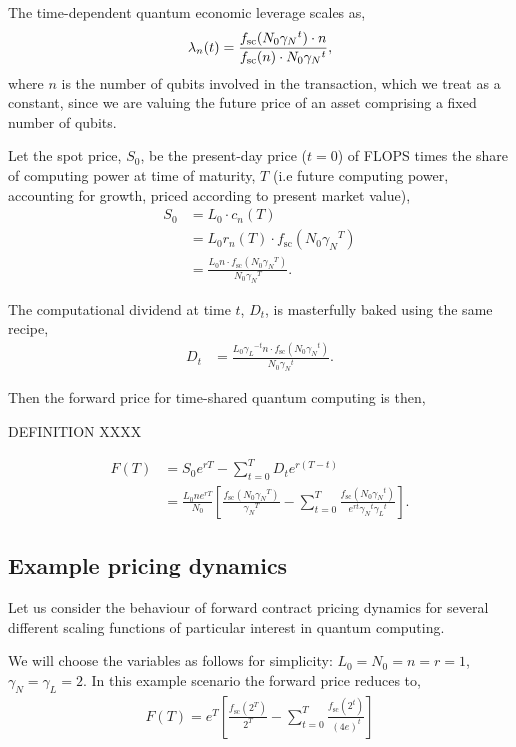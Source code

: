 \documentclass[aps,pra,twocolumn,amsmath,amssymb,nofootinbib,superscriptaddress]{revtex4}
\begin{document}
The time-dependent quantum economic leverage scales as,
\begin{align}\index{Quantum economic leverage}
\lambda_n(t) = \frac{f_\text{sc}(N_0 {\gamma_N}^{t})\cdot n}{f_\text{sc}(n) \cdot N_0 {\gamma_N}^{t}},
\end{align}
where $n$ is the number of qubits involved in the transaction, which we treat as a constant, since we are valuing the future price of an asset comprising a fixed number of qubits.

Let the spot price, $S_0$, be the present-day price ($t=0$) of FLOPS times the share of computing power at time of maturity, $T$ (i.e future computing power, accounting for growth, priced according to present market value),
\begin{align}
S_0 &= L_0 \cdot c_n(T) \nonumber \\
&= L_0 r_n(T) \cdot f_\text{sc}(N_0 {\gamma_N}^{T}) \nonumber \\
&= \frac{L_0 n\cdot f_\text{sc}(N_0 {\gamma_N}^{T})}{N_0 {\gamma_N}^{T}}.
\end{align}

The computational dividend at time $t$, $D_t$, is masterfully baked using the same recipe,
\begin{align}
D_t &= \frac{L_0 {\gamma_L}^{-t} n\cdot f_\text{sc}(N_0 {\gamma_N}^{t})}{N_0 {\gamma_N}^{t}}.
\end{align}

Then the forward price for time-shared quantum computing is then,

DEFINITION XXXX

\begin{align}
F(T) &= S_0 e^{rT} - \sum_{t=0}^T D_t e^{r(T-t)} \nonumber \\
&= \frac{L_0 n e^{rT}}{N_0}\left[ \frac{f_\text{sc}(N_0 {\gamma_N}^{T})}{{\gamma_N}^T} - \sum_{t=0}^T \frac{f_\text{sc}(N_0 {\gamma_N}^{t})}{e^{rt}{\gamma_N}^t{\gamma_L}^{t}}\right].
\end{align}

\subsection{Example pricing dynamics}

Let us consider the behaviour of forward contract pricing dynamics for several different scaling functions of particular interest in quantum computing.

We will choose the variables as follows for simplicity: \mbox{$L_0=N_0=n=r=1$}, \mbox{$\gamma_N=\gamma_L=2$}. In this example scenario the forward price reduces to,
\begin{align}
F(T) = e^{T}\left[ \frac{f_\text{sc}(2^{T})}{2^T} - \sum_{t=0}^T \frac{f_\text{sc}(2^{t})}{(4e)^t}\right]
\end{align}
\end{document}
